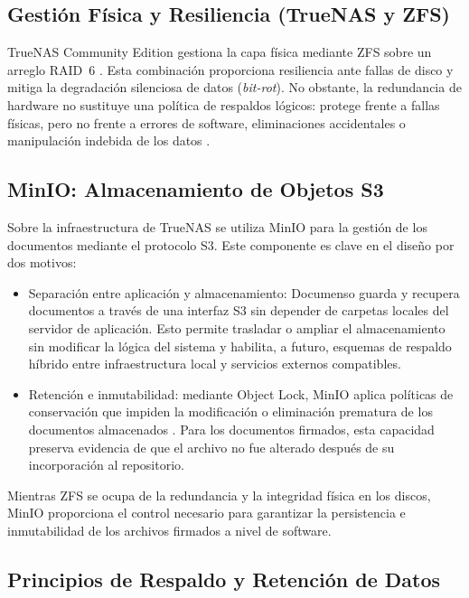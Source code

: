 \subsection{Gestión Física y Resiliencia (TrueNAS y ZFS)}
\label{subsec:teoria_raid}

TrueNAS Community Edition \cite{truenas} gestiona la capa física mediante ZFS sobre un arreglo RAID~6 \cite{techtarget_raid6}. Esta combinación proporciona resiliencia ante fallas de disco y mitiga la degradación silenciosa de datos (\textit{bit-rot}). No obstante, la redundancia de hardware no sustituye una política de respaldos lógicos: protege frente a fallas físicas, pero no frente a errores de software, eliminaciones accidentales o manipulación indebida de los datos \cite{techtarget_raid6,techtarget_retention}.

\subsection{MinIO: Almacenamiento de Objetos S3}
Sobre la infraestructura de TrueNAS se utiliza MinIO para la gestión de los documentos mediante el protocolo S3. Este componente es clave en el diseño por dos motivos:

\begin{itemize}
    \item Separación entre aplicación y almacenamiento: Documenso guarda y recupera documentos a través de una interfaz S3 sin depender de carpetas locales del servidor de aplicación. Esto permite trasladar o ampliar el almacenamiento sin modificar la lógica del sistema y habilita, a futuro, esquemas de respaldo híbrido entre infraestructura local y servicios externos compatibles.
    \item Retención e inmutabilidad: mediante Object Lock, MinIO aplica políticas de conservación que impiden la modificación o eliminación prematura de los documentos almacenados \cite{minio_object_locking}. Para los documentos firmados, esta capacidad preserva evidencia de que el archivo no fue alterado después de su incorporación al repositorio.
\end{itemize}

Mientras ZFS se ocupa de la redundancia y la integridad física en los discos, MinIO proporciona el control necesario para garantizar la persistencia e inmutabilidad de los archivos firmados a nivel de software.

\subsection{Principios de Respaldo y Retención de Datos}
\label{subsec:respaldo_retencion}

